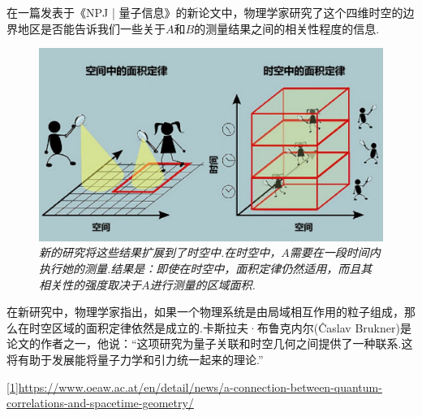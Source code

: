 \begin{multicols}{2}
在一篇发表于《NPJ | 量子信息》的新论文中，物理学家研究了这个四维时空的边界地区是否能告诉我们一些关于$A$和$B$的测量结果之间的相关性程度的信息.

\begin{figure}[H]
    \centering
    \includegraphics[width=\linewidth]{Interstellar/IMG/201907/Screenshot_20190725_152404.jpg}
    \caption{\textit{新的研究将这些结果扩展到了时空中.在时空中，$A$需要在一段时间内执行她的测量.结果是：即使在时空中，面积定律仍然适用，而且其相关性的强度取决于$A$进行测量的区域面积.}}
    
\end{figure}

在新研究中，物理学家指出，如果一个物理系统是由局域相互作用的粒子组成，那么在时空区域的面积定律依然是成立的.卡斯拉夫·布鲁克内尔(Ĉaslav Brukner)是论文的作者之一，他说：“这项研究为量子关联和时空几何之间提供了一种联系.这将有助于发展能将量子力学和引力统一起来的理论.”
\end{multicols}\vfill

\noindent{}

\noindent\url{[1]https://www.oeaw.ac.at/en/detail/news/a-connection-between-quantum-correlations-and-spacetime-geometry/}\vfill

\ADhairui





